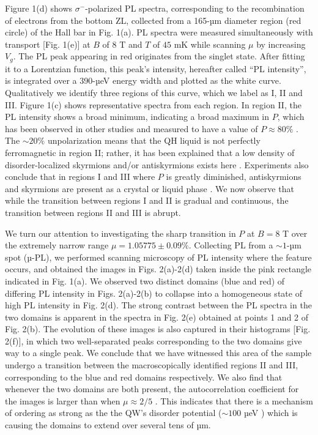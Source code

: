 \documentclass
[aps,prl,twocolumn,superscriptaddress,showpacs,floatfix]{revtex4-1}%
\begin{document}
Figure 1(d) shows $\sigma^{-}$-polarized PL spectra, corresponding to the recombination of electrons from the bottom ZL, collected from a 165-µm diameter region (red circle) of the Hall bar in Fig. 1(a). PL spectra were measured simultaneously with transport [Fig. 1(e)] at $B$ of 8 T and $T$ of $45$ mK while scanning $\mu$ by increasing $V_g$. The PL peak appearing in red originates from the singlet state. After fitting it to a Lorentzian function, this peak’s intensity, hereafter called “PL intensity”, is integrated over a 390-µeV energy width and plotted as the white curve. Qualitatively we identify three regions of this curve, which we label as I, II and III. Figure 1(c) shows representative spectra from each region. In region II, the PL intensity shows a broad minimum, indicating a broad maximum in $P$, which has been observed in other studies and measured to have a value of $P\approx80\%$ \cite{Aifer,Zhitomirsky,Khandelwal,Zhitomirsky,Plochocka,Tiemann}. The ${\sim}20\%$ unpolarization means that the QH liquid is not perfectly ferromagnetic in region II; rather, it has been explained that a low density of disorder-localized skyrmions and/or antiskyrmions exists here \cite{Khandelwal,Zhitomirsky,Guan}. Experiments also conclude that in regions I and III where $P$ is greatly diminished, antiskyrmions and skyrmions are present as a crystal or liquid phase \cite{Khandelwal,Guan,Bayot,Gallais}. We now observe that while the transition between regions I and II is gradual and continuous, the transition between regions II and III is abrupt. 

We turn our attention to investigating the sharp transition in $P$ at $B=8$ T over the extremely narrow range $\mu=1.05775\pm0.09\%$. Collecting PL from a ${\sim}1$-µm spot (µ-PL), we performed scanning microscopy of PL intensity where the feature occurs, and obtained the images in Figs. 2(a)-2(d) taken inside the pink rectangle indicated in Fig. 1(a). We observed two distinct domains (blue and red) of differing PL intensity in Figs. 2(a)-2(b) to collapse into a homogeneous state of high PL intensity in Fig. 2(d). The strong contrast between the PL spectra in the two domains is apparent in the spectra in Fig. 2(e) obtained at points 1 and 2 of Fig. 2(b). The evolution of these images is also captured in their histograms [Fig. 2(f)], in which two well-separated peaks corresponding to the two domains give way to a single peak. We conclude that we have witnessed this area of the sample undergo a transition between the macroscopically identified regions II and III, corresponding to the blue and red domains respectively. We also find that whenever the two domains are both present, the autocorrelation coefficient for the images is larger than when $\mu\approx2/5$ \cite{SI}. This indicates that there is a mechanism of ordering as strong as the the QW's disorder potential (${\sim}100$ µeV \cite{Hayakawa}) which is causing the domains to extend over several tens of µm.
\end{document}
